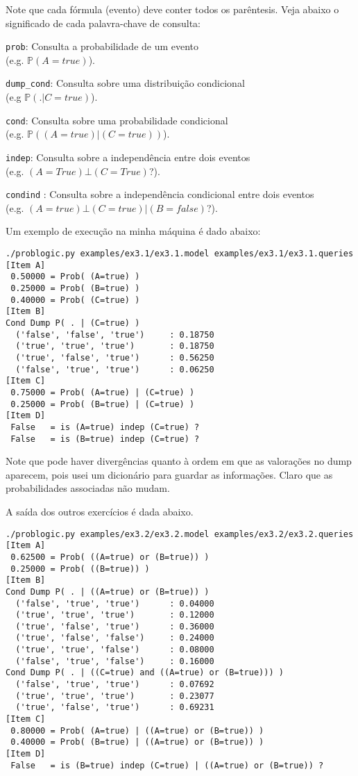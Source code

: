 \documentclass[paper=a4, fontsize=11pt]{scrartcl} %
\numberwithin{equation}{subsection}
\numberwithin{figure}{subsection}
\numberwithin{table}{subsection}
\numberwithin{definition}{subsection}
\numberwithin{theorem}{subsection}
\numberwithin{property}{subsection}
\numberwithin{proposition}{subsection}
\numberwithin{equation}{section}
\numberwithin{figure}{section}
\numberwithin{table}{section}
\numberwithin{definition}{section}
\numberwithin{theorem}{section}
\numberwithin{property}{section}
\numberwithin{proposition}{section}
\renewcommand{\P}{\mathbb{P}}
\begin{document}
Note que cada fórmula (evento) deve conter todos os parêntesis. Veja abaixo o significado de cada palavra-chave de consulta:
\begin{description}
  \setlength\itemsep{0em}
  \item \verb|prob|: Consulta a probabilidade de um evento \\ (e.g. $\P(A=true)$).
  \item \verb|dump_cond|: Consulta sobre uma distribuição condicional \\ (e.g $\P(.| C=true)$).
  \item \verb|cond|: Consulta sobre uma probabilidade condicional \\ (e.g. $\P((A=true) | (C=true))$).
  \item \verb|indep|: Consulta sobre a independência entre dois eventos \\ (e.g. $(A=True) \bot (C=True)$?). 
  \item \verb|condind| : Consulta sobre a independência condicional entre dois eventos \\ (e.g.  $(A=true) \bot (C=true) | (B=false)$?).
\end{description}


Um exemplo de execução na minha máquina é dado abaixo:
\begin{verbatim}
./problogic.py examples/ex3.1/ex3.1.model examples/ex3.1/ex3.1.queries 
[Item A]
 0.50000 = Prob( (A=true) )
 0.25000 = Prob( (B=true) )
 0.40000 = Prob( (C=true) )
[Item B]
Cond Dump P( . | (C=true) )
  ('false', 'false', 'true')     : 0.18750
  ('true', 'true', 'true')       : 0.18750
  ('true', 'false', 'true')      : 0.56250
  ('false', 'true', 'true')      : 0.06250
[Item C]
 0.75000 = Prob( (A=true) | (C=true) )
 0.25000 = Prob( (B=true) | (C=true) )
[Item D]
 False   = is (A=true) indep (C=true) ?
 False   = is (B=true) indep (C=true) ?
\end{verbatim}

Note que pode haver divergências quanto à ordem em que as valorações no dump aparecem, pois usei um dicionário para guardar as informações. Claro que as probabilidades associadas não mudam.

A saída dos outros exercícios é dada abaixo.

\begin{verbatim}
./problogic.py examples/ex3.2/ex3.2.model examples/ex3.2/ex3.2.queries
[Item A]
 0.62500 = Prob( ((A=true) or (B=true)) )
 0.25000 = Prob( ((B=true)) )
[Item B]
Cond Dump P( . | ((A=true) or (B=true)) )
  ('false', 'true', 'true')      : 0.04000
  ('true', 'true', 'true')       : 0.12000
  ('true', 'false', 'true')      : 0.36000
  ('true', 'false', 'false')     : 0.24000
  ('true', 'true', 'false')      : 0.08000
  ('false', 'true', 'false')     : 0.16000
Cond Dump P( . | ((C=true) and ((A=true) or (B=true))) )
  ('false', 'true', 'true')      : 0.07692
  ('true', 'true', 'true')       : 0.23077
  ('true', 'false', 'true')      : 0.69231
[Item C]
 0.80000 = Prob( (A=true) | ((A=true) or (B=true)) )
 0.40000 = Prob( (B=true) | ((A=true) or (B=true)) )
[Item D]
 False   = is (B=true) indep (C=true) | ((A=true) or (B=true)) ?
\end{verbatim}
\end{document}
